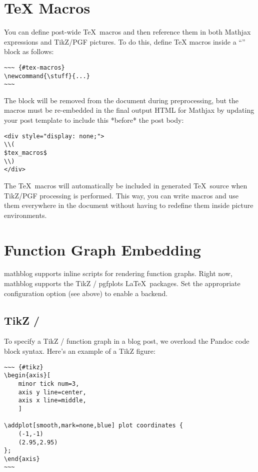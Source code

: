 \documentclass[11pt, letterpaper, oneside, titlepage]{book}
\begin{document}
\section{TeX Macros}

You can define post-wide \TeX\ macros and then reference them in both
Mathjax expressions and TikZ/PGF pictures.  To do this, define \TeX
macros inside a ``'' block as follows:

\begin{verbatim}
~~~ {#tex-macros}
\newcommand{\stuff}{...}
~~~
\end{verbatim}

The block will be removed from the document during preprocessing, but
the macros must be re-embedded in the final output HTML for Mathjax by
updating your post template to include this *before* the post body:

\begin{verbatim}
<div style="display: none;">
\\(
$tex_macros$
\\)
</div>
\end{verbatim}

The \TeX\ macros will automatically be included in generated
\TeX\ source when TikZ/PGF processing is performed.  This way, you can
write macros and use them everywhere in the document without having to
redefine them inside picture environments.

\section{Function Graph Embedding}

mathblog supports inline scripts for rendering function graphs.  Right
now, mathblog supports the TikZ / pgfplots \LaTeX\ packages.  Set the
appropriate configuration option (see above) to enable a backend.

\subsection{TikZ / }

To specify a TikZ /  function graph in a blog post, we
overload the Pandoc code block syntax.  Here's an example of a TikZ
figure:

\begin{verbatim}
~~~ {#tikz}
\begin{axis}[
    minor tick num=3,
    axis y line=center,
    axis x line=middle,
    ]

\addplot[smooth,mark=none,blue] plot coordinates {
    (-1,-1)
    (2.95,2.95)
};
\end{axis}
~~~
\end{verbatim}
\end{document}
